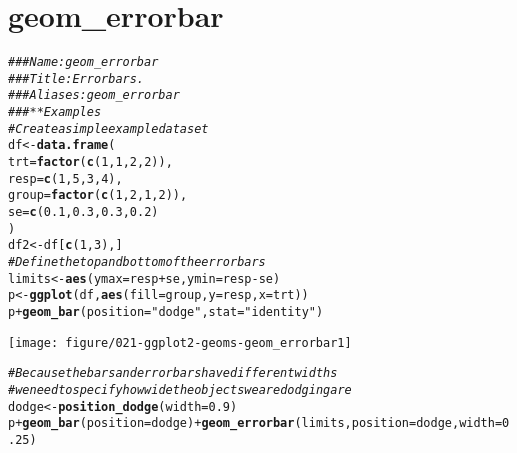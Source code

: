 \documentclass[a4paper,titlepage]{tufte-handout}\usepackage[]{graphicx}\usepackage[]{color}
\makeatletter
\def\maxwidth{ %
  \ifdim\Gin@nat@width>\linewidth
    \linewidth
  \else
    \Gin@nat@width
  \fi
}
\newcommand{\hlnum}[1]{\textcolor[rgb]{0.686,0.059,0.569}{#1}}%
\newcommand{\hlstr}[1]{\textcolor[rgb]{0.192,0.494,0.8}{#1}}%
\newcommand{\hlcom}[1]{\textcolor[rgb]{0.678,0.584,0.686}{\textit{#1}}}%
\newcommand{\hlopt}[1]{\textcolor[rgb]{0,0,0}{#1}}%
\newcommand{\hlstd}[1]{\textcolor[rgb]{0.345,0.345,0.345}{#1}}%
\newcommand{\hlkwb}[1]{\textcolor[rgb]{0.69,0.353,0.396}{#1}}%
\newcommand{\hlkwc}[1]{\textcolor[rgb]{0.333,0.667,0.333}{#1}}%
\newcommand{\hlkwd}[1]{\textcolor[rgb]{0.737,0.353,0.396}{\textbf{#1}}}%
\newenvironment{kframe}{%
 \def\at@end@of@kframe{}%
 \ifinner\ifhmode%
  \def\at@end@of@kframe{\end{minipage}}%
  \begin{minipage}{\columnwidth}%
 \fi\fi%
 \def\FrameCommand##1{\hskip\@totalleftmargin \hskip-\fboxsep
 \colorbox{shadecolor}{##1}\hskip-\fboxsep
     \hskip-\linewidth \hskip-\@totalleftmargin \hskip\columnwidth}%
 \MakeFramed {\advance\hsize-\width
   \@totalleftmargin\z@ \linewidth\hsize
   \@setminipage}}%
 {\par\unskip\endMakeFramed%
 \at@end@of@kframe}
\newenvironment{knitrout}{}{} %
\makeatother
\begin{document}
\section{geom\_errorbar}

\begin{knitrout}
\color{fgcolor}\begin{kframe}
\begin{alltt}
\hlcom{### Name: geom_errorbar}
\hlcom{### Title: Error bars.}
\hlcom{### Aliases: geom_errorbar}
\hlcom{### ** Examples}
\hlcom{# Create a simple example dataset}
\hlstd{df} \hlkwb{<-} \hlkwd{data.frame}\hlstd{(}
  \hlkwc{trt} \hlstd{=} \hlkwd{factor}\hlstd{(}\hlkwd{c}\hlstd{(}\hlnum{1}\hlstd{,} \hlnum{1}\hlstd{,} \hlnum{2}\hlstd{,} \hlnum{2}\hlstd{)),}
  \hlkwc{resp} \hlstd{=} \hlkwd{c}\hlstd{(}\hlnum{1}\hlstd{,} \hlnum{5}\hlstd{,} \hlnum{3}\hlstd{,} \hlnum{4}\hlstd{),}
  \hlkwc{group} \hlstd{=} \hlkwd{factor}\hlstd{(}\hlkwd{c}\hlstd{(}\hlnum{1}\hlstd{,} \hlnum{2}\hlstd{,} \hlnum{1}\hlstd{,} \hlnum{2}\hlstd{)),}
  \hlkwc{se} \hlstd{=} \hlkwd{c}\hlstd{(}\hlnum{0.1}\hlstd{,} \hlnum{0.3}\hlstd{,} \hlnum{0.3}\hlstd{,} \hlnum{0.2}\hlstd{)}
\hlstd{)}
\hlstd{df2} \hlkwb{<-} \hlstd{df[}\hlkwd{c}\hlstd{(}\hlnum{1}\hlstd{,}\hlnum{3}\hlstd{),]}
\hlcom{# Define the top and bottom of the errorbars}
\hlstd{limits} \hlkwb{<-} \hlkwd{aes}\hlstd{(}\hlkwc{ymax} \hlstd{= resp} \hlopt{+} \hlstd{se,} \hlkwc{ymin}\hlstd{=resp} \hlopt{-} \hlstd{se)}
\hlstd{p} \hlkwb{<-} \hlkwd{ggplot}\hlstd{(df,} \hlkwd{aes}\hlstd{(}\hlkwc{fill}\hlstd{=group,} \hlkwc{y}\hlstd{=resp,} \hlkwc{x}\hlstd{=trt))}
\hlstd{p} \hlopt{+} \hlkwd{geom_bar}\hlstd{(}\hlkwc{position}\hlstd{=}\hlstr{"dodge"}\hlstd{,} \hlkwc{stat}\hlstd{=}\hlstr{"identity"}\hlstd{)}
\end{alltt}
\end{kframe}
\texttt{[image: figure/021-ggplot2-geoms-geom\_errorbar1]} 
\begin{kframe}\begin{alltt}
\hlcom{# Because the bars and errorbars have different widths}
\hlcom{# we need to specify how wide the objects we are dodging are}
\hlstd{dodge} \hlkwb{<-} \hlkwd{position_dodge}\hlstd{(}\hlkwc{width}\hlstd{=}\hlnum{0.9}\hlstd{)}
\hlstd{p} \hlopt{+} \hlkwd{geom_bar}\hlstd{(}\hlkwc{position}\hlstd{=dodge)} \hlopt{+} \hlkwd{geom_errorbar}\hlstd{(limits,} \hlkwc{position}\hlstd{=dodge,} \hlkwc{width}\hlstd{=}\hlnum{0.25}\hlstd{)}
\end{alltt}



\end{kframe}
\end{knitrout}
\end{document}
